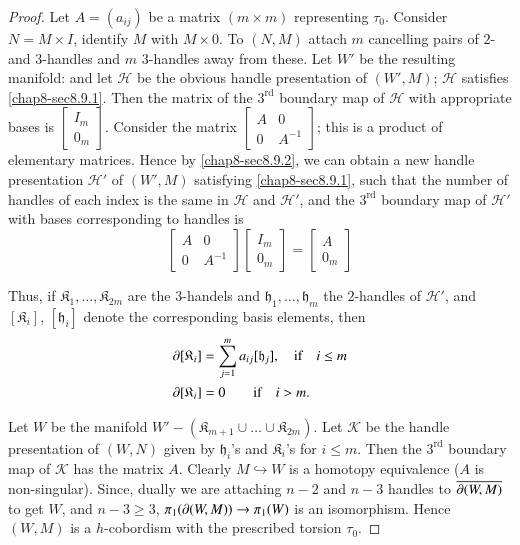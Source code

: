 \begin{proof}
Let $A=(a_{ij})$ be a matrix $(m\times m)$ representing $\tau_{0}$. Consider $N=M\times I$, identify $M$ with $M\times 0$. To $(N,M)$ attach $m$ cancelling pairs of $2$- and $3$-handles and $m$ $3$-handles away from these. Let $W'$ be the resulting manifold: and let $\mathscr{H}$ be the obvious handle\pageoriginale 
presentation of $(W',M)$; $\mathscr{H}$ satisfies \ref{chap8-sec8.9.1}. Then the matrix of the $3^{\text{rd}}$ boundary map of $\mathscr{H}$ with appropriate bases is $\left[\begin{smallmatrix} I_{m}\\ 0_{m}\end{smallmatrix}\right]$. Consider the matrix $\left[\begin{smallmatrix} A & 0\\ 0 & A^{-1}\end{smallmatrix}\right]$; this is a product of elementary matrices. Hence by \ref{chap8-sec8.9.2}, we can obtain a new handle presentation $\mathscr{H}'$ of $(W',M)$ satisfying \ref{chap8-sec8.9.1}, such that the number of handles of each index is the same in $\mathscr{H}$ and $\mathscr{H}'$, and the $3^{\text{rd}}$ boundary map of $\mathscr{H}'$ with bases corresponding to handles is 
$$ 
\begin{bmatrix}
A & 0\\ 
0 & A^{-1} 
\end{bmatrix}
\begin{bmatrix}
I_{m}\\
0_{m}
\end{bmatrix}
=
\begin{bmatrix}
A \\ 0_{m}
\end{bmatrix}
$$

Thus, if $\mathfrak{K}_{1},\ldots,\mathfrak{K}_{2m}$ are the 3-handels and $\mathfrak{h}_{1},\ldots,\mathfrak{h}_{m}$ the $2$-handles of $\mathscr{H}'$, and $[\mathfrak{K}_{i}]$, $[\mathfrak{h}_{i}]$ denote the corresponding basis elements, then
\begin{align*}
& \partial[\mathfrak{K}_{i}]=\sum^{m}_{j=1}a_{ij}[\mathfrak{h}_{j}],\quad \text{if}\quad i\leq m\\
& \partial[\mathfrak{K}_{i}]=0\qquad \text{if}\quad i>m.
\end{align*}

Let $W$ be the manifold $W'-(\mathfrak{K}_{m+1}\cup\ldots\cup \mathfrak{K}_{2m})$. Let $\mathscr{K}$ be the handle presentation of $(W,N)$ given by $\mathfrak{h}_{i}$'s and $\mathfrak{K}_{i}$'s for $i\leq m$. Then the $3^{\text{rd}}$ boundary map of $\mathscr{K}$ has the matrix $A$. Clearly $M\hookrightarrow W$ is a homotopy equivalence ($A$ is non-singular). Since, dually we are attaching $n-2$ and $n-3$ handles to $\overline{\partial (W,M)}$ to get $W$, and $n-3\geq 3$, $\pi_{1}(\partial (W,M))\to \pi_{1}(W)$ is an isomorphism. Hence $(W,M)$ is a $h$-cobordism with the prescribed torsion $\tau_{0}$.
\end{proof}

